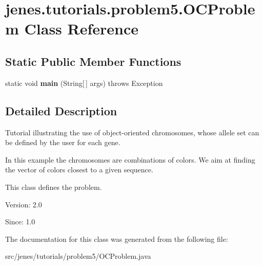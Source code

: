 \hypertarget{classjenes_1_1tutorials_1_1problem5_1_1_o_c_problem}{
\section{jenes.tutorials.problem5.OCProblem Class Reference}
\label{classjenes_1_1tutorials_1_1problem5_1_1_o_c_problem}
}
\subsection*{Static Public Member Functions}
\begin{CompactItemize}
\item 
\hypertarget{classjenes_1_1tutorials_1_1problem5_1_1_o_c_problem_ecd726bedeefdb1bfce0b0d453bef17e}{
static void \textbf{main} (String\mbox{[}$\,$\mbox{]} args)  throws Exception }
\label{classjenes_1_1tutorials_1_1problem5_1_1_o_c_problem_ecd726bedeefdb1bfce0b0d453bef17e}

\end{CompactItemize}


\subsection{Detailed Description}
Tutorial illustrating the use of object-oriented chromosomes, whose allele set can be defined by the user for each gene.

In this example the chromosomes are combinations of colors. We aim at finding the vector of colors closest to a given sequence.

This class defines the problem.

\begin{Desc}
\item[Version:]2.0 \end{Desc}
\begin{Desc}
\item[Since:]1.0 \end{Desc}


The documentation for this class was generated from the following file:\begin{CompactItemize}
\item 
src/jenes/tutorials/problem5/OCProblem.java\end{CompactItemize}
